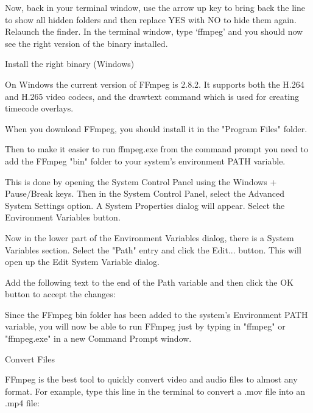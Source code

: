 \begin{fullwidth}
Now, back in your terminal window, use the arrow up key to bring back the line to show all hidden folders and then replace YES with NO to hide them again. Relaunch the finder. In the terminal window, type ‘ffmpeg’ and you should now see the right version of the binary installed.

{\large Install the right binary (Windows)\par}

On Windows the current version of FFmpeg is 2.8.2. It supports both the H.264 and H.265 video codecs, and the drawtext command which is used for creating timecode overlays.

When you download FFmpeg, you should install it in the "Program Files" folder.

Then to make it easier to run ffmpeg.exe from the command prompt you need to add the FFmpeg "bin" folder to your system's environment PATH variable.

 This is done by opening the System Control Panel using the Windows + Pause/Break keys. Then in the System Control Panel, select the Advanced System Settings option. A System Properties dialog will appear. Select the Environment Variables button.

Now in the lower part of the Environment Variables dialog, there is a System Variables section. Select the "Path" entry and click the Edit... button. This will open up the Edit System Variable dialog.


Add the following text to the end of the Path variable and then click the OK button to accept the changes:



Since the FFmpeg bin folder has been added to the system's Environment PATH variable, you will now be able to run FFmpeg just by typing in "ffmpeg" or "ffmpeg.exe" in a new Command Prompt window.

{\large Convert Files \par}

FFmpeg is the best tool to quickly convert video and audio files to almost any format. For example, type this line in the terminal to convert a .mov file into an .mp4 file:



\end{fullwidth}
